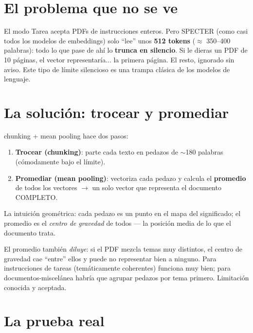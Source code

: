 \documentclass[11pt,a4paper]{article}
\begin{document}

\section{El problema que no se ve}

El modo Tarea acepta PDFs de instrucciones enteros. Pero SPECTER (como casi todos los
modelos de embeddings) solo ``lee'' unos \textbf{512 tokens} ($\approx$ 350--400 palabras):
todo lo que pase de ahí lo \textbf{trunca en silencio}. Si le dieras un PDF de 10 páginas,
el vector representaría... la primera página. El resto, ignorado sin aviso. Este tipo de
límite silencioso es una trampa clásica de los modelos de lenguaje.

\section{La solución: trocear y promediar}

\begin{concepto}{chunking + mean pooling}
 hace dos pasos:
\begin{enumerate}
  \item \textbf{Trocear (chunking)}: parte cada texto en pedazos de $\sim$180 palabras
        (cómodamente bajo el límite).
  \item \textbf{Promediar (mean pooling)}: vectoriza cada pedazo y calcula el
        \textbf{promedio} de todos los vectores $\rightarrow$ un solo vector que representa
        el documento COMPLETO.
\end{enumerate}
La intuición geométrica: cada pedazo es un punto en el mapa del significado; el promedio es
el \emph{centro de gravedad} de todos — la posición media de lo que el documento trata.
\end{concepto}

\begin{ojo}
El promedio también \emph{diluye}: si el PDF mezcla temas muy distintos, el centro de
gravedad cae ``entre'' ellos y puede no representar bien a ninguno. Para instrucciones de
tareas (temáticamente coherentes) funciona muy bien; para documentos-miscelánea habría que
agrupar pedazos por tema primero. Limitación conocida y aceptada.
\end{ojo}

\section{La prueba real}
\end{document}
